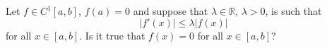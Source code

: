 \documentclass{article}
\begin{document}
	\setlength{\parindent}{0pt}
	Let $f\in C^1	[a, b]$, $f(a) = 0$ and suppose that $\lambda \in \mathbb{R}$, $\lambda> 0$, is such that
	$$\lvert f'(x)\rvert \leq \lambda\lvert f(x)\rvert$$ for all $x \in [a, b]$. Is it true that $f(x) = 0$ for all $x \in [a, b]$?
\end{document}
